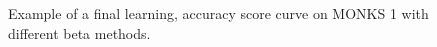 \begin{appendices}
            \begin{figure}[H]
                \centering
                \begin{subfigure}{0.4\textwidth}
                    \caption{}
                    \label{fig:monks_1_MSE_CGD}
                \end{subfigure}
                \begin{subfigure}{0.4\textwidth}
                    \caption{}
                    \label{fig:monks_1_ACC_CGD}
                \end{subfigure}
                \caption{Example of a final learning, accuracy score curve on MONKS 1 with different beta methods.}
                \label{fig:monks_1_CGD}
            \end{figure}


\end{appendices}
